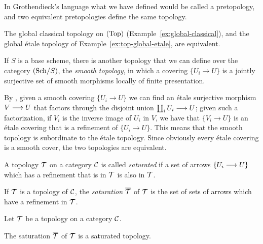 \begin{2   CONTRAVARIANT FUNCTORS}
\begin{2.3 Sheaves in Grothendieck topologies}
In Grothendieck's language what we have defined would be called a pretopology, and two equivalent pretopologies define the same topology.

\begin{example}
The global classical topology on $(\mathrm{Top})$ (Example~\ref{ex:global-classical}), and the global \'etale topology of Example~\ref{ex:top-global-etale}, are equivalent.
\end{example}

\begin{example}
If $S$ is a base scheme, there is another topology that we can define over the category $({\mathrm{Sch}/S})$, the \emph{smooth topology}, in which a covering $\{U_{i}\to U\}$ is a jointly surjective set of smooth morphisms locally of finite presentation.

By \cite[Corollaire~17.16.3]{ega4-4}, given a smooth covering $\{U_{i}\to U\}$ we can find an \'etale surjective morphism $V \arr U$ that factors through the disjoint union $\coprod_{i}U_{i} \arr U$; given such a factorization, if $V_{i}$ is the inverse image of $U_{i}$ in $V$, we have that $\{V_{i} \to U\}$ is an \'etale covering that is a refinement of $\{U_{i}\to U\}$. This means that the smooth topology is subordinate to the \'etale topology. Since obviously every \'etale covering is a smooth cover, the two topologies are equivalent.
\end{example}


\begin{definition}\label{def:saturation}
A topology $\mathcal{T}$ on a category $\mathcal{C}$ is called \emph{saturated} if a set of arrows $\{U_{i} \arr U\}$ which has a refinement that is in $\mathcal{T}$ is also in $\mathcal{T}$.

If $\mathcal{T}$ is a topology of $\mathcal{C}$, the \emph{saturation} $\overline{\mathcal{T}}$ of $\mathcal{T}$ is the set of sets of arrows which have a refinement in $\mathcal{T}$.
\end{definition}


\begin{proposition}
Let $\mathcal{T}$ be a topology on a category $\mathcal{C}$.

\begin{enumeratei}

\item The saturation $\overline{\mathcal{T}}$ of $\mathcal{T}$ is a saturated topology.


\end{enumeratei}
\end{proposition}
\end{2.3 Sheaves in Grothendieck topologies}
\end{2   CONTRAVARIANT FUNCTORS}
